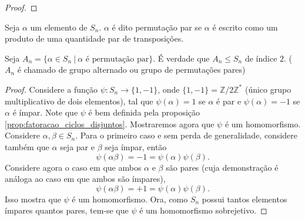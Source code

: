 \documentclass[11pt,openany]{book}
\begin{document}
\begin{proof}

\end{proof}

\begin{definition}
\label{def:permutacao_par}
    Seja $\alpha$ um elemento de $S_n$. $\alpha$ é dito permutação par se $\alpha$ é escrito como um produto de uma quantidade par de transposições.
\end{definition}
\begin{proposition}
\label{prop:}
    Seja $A_n = \{\alpha \in S_n \ | \ \text{$\alpha$ é permutação par}\}.$ É verdade que $A_n \leq S_n$ de índice $2$. ($A_n$ é chamado de grupo alternado ou grupo de permutações pares)
\end{proposition}

\begin{proof}
    Considere a função $\psi: S_n \rightarrow \{1, -1\}$, onde $\{1, -1\} = \mathbb{Z}/2\mathbb{Z}^*$ (único grupo multiplicativo de dois elementos), tal que $\psi(\alpha) = 1$ se $\alpha$ é par e $\psi(\alpha) = -1$ se $\alpha$ é ímpar. Note que $\psi$ é bem definida pela proposição \ref{prop:fatoracao_ciclos_disjuntos}. Mostraremos agora que $\psi$ é um homomorfismo. Considere $\alpha, \beta \in S_n$. Para o primeiro caso e sem perda de generalidade, considere também que $\alpha$ seja par e $\beta$ seja ímpar, então
    \[\psi(\alpha \beta) =  -1 = \psi(\alpha) \psi(\beta).\]
    Considere agora o caso em que ambos $\alpha$ e $\beta$ são pares (cuja demonstração é análoga ao caso em que ambos são ímpares),
    \[\psi(\alpha \beta) = +1 = \psi(\alpha) \psi(\beta).\]
    Isso mostra que $\psi$ é um homomorfismo.
    Ora, como $S_n$ possui tantos elementos ímpares quantos pares, tem-se que $\psi$ é um homomorfismo sobrejetivo.
\end{proof}
\end{document}
